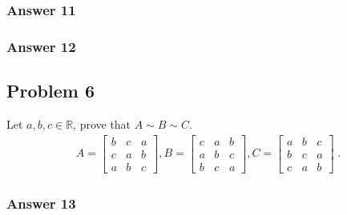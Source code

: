 \documentclass[11pt]{article}
\begin{document}
\subsubsection{Answer 11}
\label{sec-1-5-1}

\subsubsection{Answer 12}
\label{sec-1-5-2}

\subsection{Problem 6}
\label{sec-1-6}
Let $a, b, c \in \mathbb{R}$, prove that $A \sim B \sim C$.
\begin{align*}
  A = \begin{bmatrix}
    b & c & a \\
    c & a & b \\
    a & b & c
  \end{bmatrix},
  B = \begin{bmatrix}
    c & a & b \\
    a & b & c \\
    b & c & a
  \end{bmatrix},
  C = \begin{bmatrix}
    a & b & c \\
    b & c & a \\
    c & a & b
  \end{bmatrix}\;.
\end{align*}

\subsubsection{Answer 13}
\label{sec-1-6-1}
\end{document}
